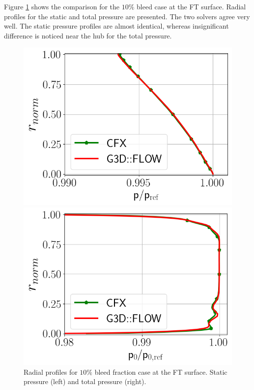 Figure \ref{fig:FT10} shows the comparison for the $10\%$ bleed case at the FT surface. Radial profiles for the static and total pressure are presented. The two solvers agree very well. The static pressure profiles are almost identical, whereas insignificant difference is noticed near the hub for the total pressure.
\begin{figure}[h!]
  \centering
  \begin{minipage}{0.48\columnwidth}
  \includegraphics[width=1.\textwidth]{figures/PAaveB10_FT.png}
  \end{minipage}
  \begin{minipage}{0.48\columnwidth}
  \includegraphics[width=1.\textwidth]{figures/P0MaveB10_FT.png}
  \end{minipage}
  \caption{Radial profiles for $10\%$ bleed fraction case at the FT surface. Static pressure (left) and total pressure (right).} \label{fig:FT10}
\end{figure}

